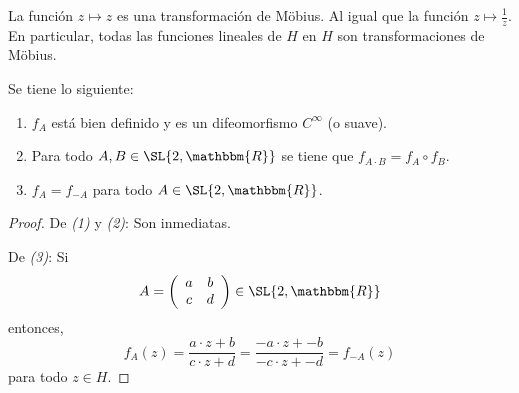 \documentclass[12pt]{report}
\newcounter{it}
\theoremstyle{largebreak}
\newcommand{\bbm}[1]{\ensuremath{\mathbbm{#1}}}
\begin{document}
    \begin{exa}
        La función $z\mapsto z$ es una transformación de Möbius. Al igual que la función $z\mapsto\frac{1}{z}$. En particular, todas las funciones lineales de $H$ en $H$ son transformaciones de Möbius.
    \end{exa}

    \begin{propo}
        Se tiene lo siguiente:
        \begin{enumerate}[label = \textit{(\arabic*)}]
            \item $f_A$ está bien definido y es un difeomorfismo $C^\infty$ (o suave).
            \item Para todo $A,B\in\SL{2,\bbm{R}}$ se tiene que $f_{A\cdot B}=f_A\circ f_B$.
            \item $f_A=f_{-A}$ para todo $A\in\SL{2,\bbm{R}}$.
        \end{enumerate}
    \end{propo}

    \begin{proof}
        De \textit{(1)} y \textit{(2)}: Son inmediatas.

        De \textit{(3)}: Si
        \begin{equation*}
            A=\left(
                \begin{array}{cc}
                    a & b \\
                    c & d \\
                \end{array}
             \right)\in\SL{2,\bbm{R}}
        \end{equation*}
        entonces,
        \begin{equation*}
            f_A(z)=\frac{a\cdot z+b}{c\cdot z+d}=\frac{-a\cdot z+-b}{-c\cdot z+-d}=f_{-A}(z)
        \end{equation*}
        para todo $z\in H$.
    \end{proof}
\end{document}
